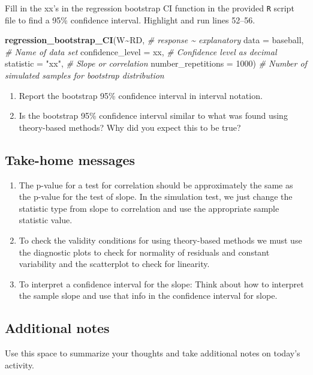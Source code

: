 \documentclass[
]{report}
\newenvironment{Shaded}{\begin{snugshade}}{\end{snugshade}}
\newcommand{\CommentTok}[1]{\textcolor[rgb]{0.56,0.35,0.01}{\textit{#1}}}
\newcommand{\DataTypeTok}[1]{\textcolor[rgb]{0.13,0.29,0.53}{#1}}
\newcommand{\DecValTok}[1]{\textcolor[rgb]{0.00,0.00,0.81}{#1}}
\newcommand{\KeywordTok}[1]{\textcolor[rgb]{0.13,0.29,0.53}{\textbf{#1}}}
\newcommand{\NormalTok}[1]{#1}
\newcommand{\OperatorTok}[1]{\textcolor[rgb]{0.81,0.36,0.00}{\textbf{#1}}}
\newcommand{\StringTok}[1]{\textcolor[rgb]{0.31,0.60,0.02}{#1}}
\begin{document}
\vspace{0.5in}

Fill in the xx's in the regression bootstrap CI function in the provided \texttt{R} script file to find a 95\% confidence interval. Highlight and run lines 52--56.

\begin{Shaded}
\begin{Highlighting}[]
\KeywordTok{regression\_bootstrap\_CI}\NormalTok{(W}\OperatorTok{\textasciitilde{}}\NormalTok{RD, }\CommentTok{\# response \textasciitilde{} explanatory}
                        \DataTypeTok{data =}\NormalTok{ baseball, }\CommentTok{\# Name of data set}
                        \DataTypeTok{confidence\_level =}\NormalTok{ xx, }\CommentTok{\# Confidence level as decimal}
                        \DataTypeTok{statistic =} \StringTok{"xx"}\NormalTok{, }\CommentTok{\# Slope or correlation}
                        \DataTypeTok{number\_repetitions =} \DecValTok{1000}\NormalTok{) }\CommentTok{\# Number of simulated samples for bootstrap distribution}
\end{Highlighting}
\end{Shaded}

\begin{enumerate}
\def\labelenumi{\arabic{enumi}.}
\setcounter{enumi}{3}
\item
  Report the bootstrap 95\% confidence interval in interval notation.\\
  \vspace{0.5in}
\item
  Is the bootstrap 95\% confidence interval similar to what was found using theory-based methods? Why did you expect this to be true?
\end{enumerate}

\vspace{1in}

\hypertarget{take-home-messages-11}{%
\subsection{Take-home messages}\label{take-home-messages-11}}

\begin{enumerate}
\def\labelenumi{\arabic{enumi}.}
\item
  The p-value for a test for correlation should be approximately the same as the p-value for the test of slope. In the simulation test, we just change the statistic type from slope to correlation and use the appropriate sample statistic value.
\item
  To check the validity conditions for using theory-based methods we must use the diagnostic plots to check for normality of residuals and constant variability and the scatterplot to check for linearity.
\item
  To interpret a confidence interval for the slope: Think about how to interpret the sample slope and use that info in the confidence interval for slope.
\end{enumerate}

\hypertarget{additional-notes-11}{%
\subsection{Additional notes}\label{additional-notes-11}}

Use this space to summarize your thoughts and take additional notes on today's activity.
\end{document}
